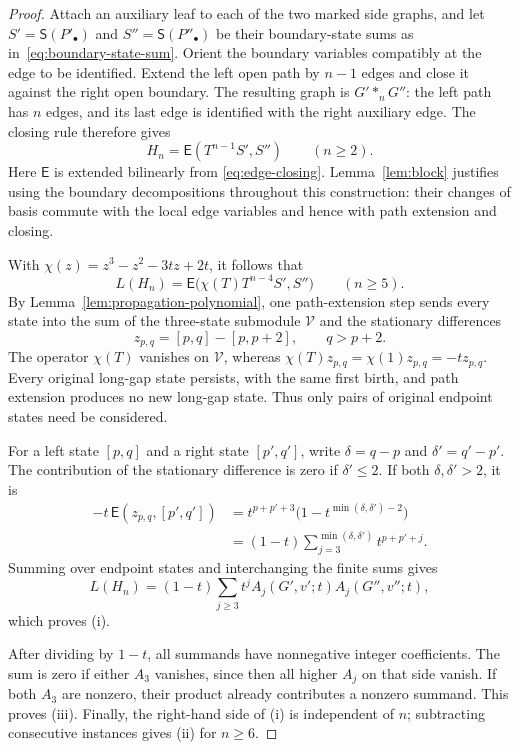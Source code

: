 \documentclass[reqno]{article}
\theoremstyle{plain} %
\theoremstyle{definition}
\theoremstyle{remark}
\numberwithin{equation}{section}
\begin{document}
\begin{proof}
Attach an auxiliary leaf to each of the two marked side graphs, and
let $S'=\mathsf S(P'_\bullet)$ and $S''=\mathsf S(P''_\bullet)$
be their boundary-state sums as in~\eqref{eq:boundary-state-sum}. Orient the boundary variables compatibly at the
edge to be identified. Extend the left open path by $n-1$ edges
and close it against the right open boundary. The resulting graph is
$G'\ast_nG''$: the left path has $n$ edges, and its last edge is
identified with the right auxiliary edge. The closing rule therefore
gives
\[
 H_n=\mathsf E(T^{n-1}S',S'')\qquad(n\ge2).
\]
Here $\mathsf E$ is extended bilinearly from
\eqref{eq:edge-closing}. Lemma~\ref{lem:block} justifies using the
boundary decompositions throughout this construction: their changes of
basis commute with the local edge variables and hence with path extension
and closing.

With $\chi(z)=z^3-z^2-3tz+2t$, it follows that
\[
 L(H_n)=\mathsf E\bigl(\chi(T)T^{n-4}S',S''\bigr)
 \qquad(n\ge5).
\]
By Lemma~\ref{lem:propagation-polynomial}, one path-extension step sends
every state into the sum of the three-state submodule $\mathcal V$ and
the stationary differences
\[
 z_{p,q}=[p,q]-[p,p+2],\qquad q>p+2.
\]
The operator $\chi(T)$ vanishes on $\mathcal V$, whereas
$\chi(T)z_{p,q}=\chi(1)z_{p,q}=-t z_{p,q}$. Every original long-gap
state persists, with the same first birth, and path extension produces no
new long-gap state. Thus only pairs of original endpoint states need
be considered.

For a left state $[p,q]$ and a right state $[p',q']$, write
$\delta=q-p$ and $\delta'=q'-p'$. The contribution of the stationary
difference is zero if $\delta'\le2$. If both $\delta,\delta'>2$, it is
\begin{align*}
 -t\,\mathsf E(z_{p,q},[p',q'])
 &=t^{p+p'+3}\bigl(1-t^{\min(\delta,\delta')-2}\bigr)\\
 &=(1-t)\sum_{j=3}^{\min(\delta,\delta')}t^{p+p'+j}.
\end{align*}
Summing over endpoint states and interchanging the finite sums gives
\[
 L(H_n)=(1-t)\sum_{j\ge3}t^j
 A_j(G',v';t)A_j(G'',v'';t),
\]
which proves (i).

After dividing by $1-t$, all summands have nonnegative integer
coefficients. The sum is zero if either $A_3$ vanishes, since then all
higher $A_j$ on that side vanish. If both $A_3$ are nonzero, their
product already contributes a nonzero summand. This proves (iii).
Finally, the right-hand side of (i) is independent of $n$; subtracting
consecutive instances gives (ii) for $n\ge6$.
\end{proof}
\end{document}
